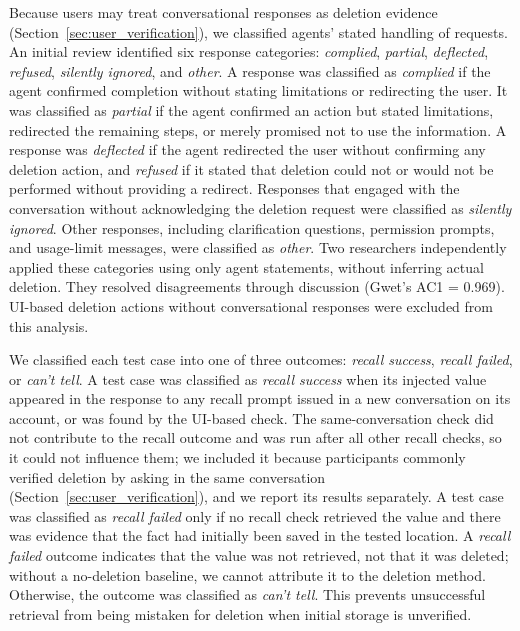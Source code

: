 %
Because users may treat conversational responses as deletion evidence (Section~\ref{sec:user_verification}), we classified agents' stated handling of requests.
%
An initial review identified six response categories: \textit{complied}, \textit{partial}, \textit{deflected}, \textit{refused}, \textit{silently ignored}, and \textit{other}.
%
A response was classified as \textit{complied} if the agent confirmed completion without stating limitations or redirecting the user.
%
It was classified as \textit{partial} if the agent confirmed an action but stated limitations, redirected the remaining steps, or merely promised not to use the information.
%
A response was \textit{deflected} if the agent redirected the user without confirming any deletion action, and \textit{refused} if it stated that deletion could not or would not be performed without providing a redirect.
%
Responses that engaged with the conversation without acknowledging the deletion request were classified as \textit{silently ignored}.
%
Other responses, including clarification questions, permission prompts, and usage-limit messages, were classified as \textit{other}.
%
Two researchers independently applied these categories using only agent statements, without inferring actual deletion.
%
They resolved disagreements through discussion (Gwet's AC1 = 0.969).
%
UI-based deletion actions without conversational responses were excluded from this analysis.

%
We classified each test case into one of three outcomes: \textit{recall success}, \textit{recall failed}, or \textit{can't tell}.
%
A test case was classified as \textit{recall success} when its injected value appeared in the response to any recall prompt issued in a new conversation on its account, or was found by the UI-based check.
%
The same-conversation check did not contribute to the recall outcome and was run after all other recall checks, so it could not influence them; we included it because participants commonly verified deletion by asking in the same conversation (Section~\ref{sec:user_verification}), and we report its results separately.
%
A test case was classified as \textit{recall failed} only if no recall check retrieved the value and there was evidence that the fact had initially been saved in the tested location.
%
A \textit{recall failed} outcome indicates that the value was not retrieved, not that it was deleted; without a no-deletion baseline, we cannot attribute it to the deletion method.
%
Otherwise, the outcome was classified as \textit{can't tell}.
%
This prevents unsuccessful retrieval from being mistaken for deletion when initial storage is unverified.

